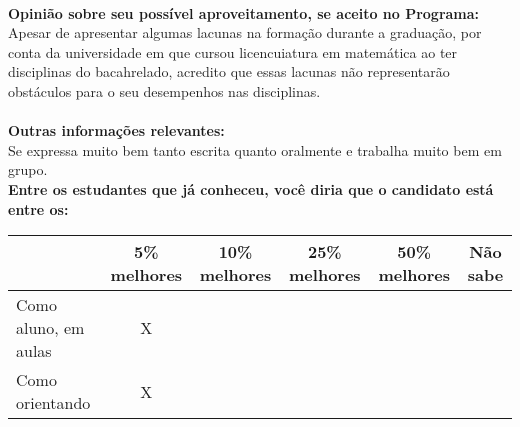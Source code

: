 \documentclass[11pt]{article}
\begin{document}
\\
\textbf{Opinião sobre seu possível aproveitamento, se aceito no Programa:}
\\Apesar de apresentar algumas lacunas na formação durante a graduação, por conta da universidade em que cursou licencuiatura em matemática ao ter disciplinas do bacahrelado, acredito que essas lacunas não representarão obstáculos para o seu desempenhos nas disciplinas.\\ 
\\
\textbf{Outras informações relevantes:} \\Se expressa muito bem tanto escrita quanto oralmente e trabalha muito bem em grupo.
\\[0.3cm]
\textbf{Entre os estudantes que já conheceu, você diria que o candidato está entre os:}
\\
\begin{tabular}{|l|c|c|c|c|c|}
\hline
 & 5\% melhores & 10\% melhores & 25\% melhores & 50\% melhores & Não sabe \\
\hline
Como aluno, em aulas & X &  &  &  & \\
\hline
Como orientando & X &  &  &  & \\
\hline
\end{tabular}
\end{document}
